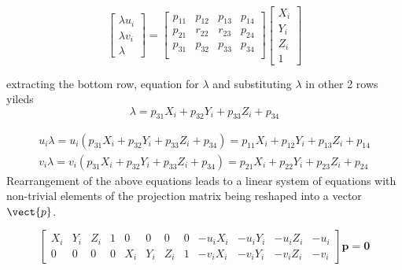 \begin{equation*}
\left[ 
\begin{array}{c} \lambda u_i\\ \lambda v_i\\ \lambda  \end{array} 
\right] = 
\begin{bmatrix}
p_{11} &p_{12}  &p_{13}  &p_{14}\\
p_{21} &r_{22}  &r_{23}  &p_{24}\\
p_{31} &p_{32}  &p_{33}  &p_{34} \\
\end{bmatrix}
\left[ 
\begin{array}{c} X_i\\ Y_i\\ Z_i\\ 1 \end{array} 
\right]
\end{equation*} 

extracting the bottom row, equation for $\lambda$ and substituting $\lambda$ in other 2 rows yileds
\begin{equation*}
\lambda = p_{31}\textbf{$X_i$} + p_{32}\textbf{$Y_i$} + p_{33}\textbf{$Z_i$} + p_{34}
\end{equation*}

\begin{equation*}
\begin{split}
\textbf{$u_i$}\lambda = \textbf{$u_i$} (p_{31}\textbf{$X_i$} + p_{32}\textbf{$Y_i$} +  p_{33}\textbf{$Z_i$} + p_{34}) = p_{11}\textbf{$X_i$} + p_{12}\textbf{$Y_i$} + p_{13}\textbf{$Z_i$} + p_{14}\\
\textbf{$v_i$}\lambda = \textbf{$v_i$} (p_{31}\textbf{$X_i$} + p_{32}\textbf{$Y_i$} +  p_{33}\textbf{$Z_i$} + p_{34}) = p_{21}\textbf{$X_i$} + p_{22}\textbf{$Y_i$} + p_{23}\textbf{$Z_i$} + p_{24}
\end{split}
\end{equation*}
Rearrangement of the above equations leads to a linear system of equations with non-trivial elements of the projection matrix being reshaped into a vector $\vect{p}$.   

\begin{equation}
\begin{bmatrix}
\textbf{$X_i$} & \textbf{$Y_i$} & \textbf{$Z_i$} & 1 & 0 & 0 & 0 & 0 & \textbf{$-u_i X_i$} & \textbf{$-u_iY_i$} & \textbf{$-u_i Z_i$} & -u_i\\
0 & 0 & 0 & 0 & \textbf{$X_i$} & \textbf{$Y_i$}  & \textbf{$Z_i$} & 1 & \textbf{$-v_iX_i$} & \textbf{$-v_iY_i$} & \textbf{$-v_iZ_i$} & -v_i
\end{bmatrix}
\textbf{p} = \textbf{0}
\label{eq:mat_projection_1}
\end{equation} 

